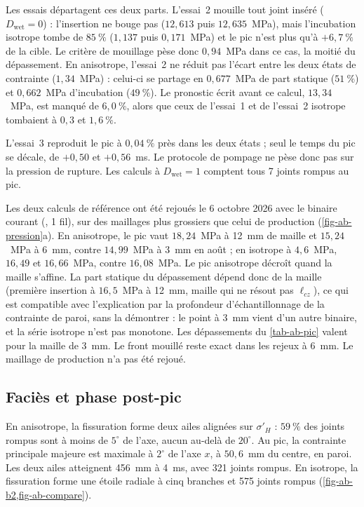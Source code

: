 Les essais départagent ces deux parts. L'essai~2 mouille tout joint inséré ($D_\text{wet} = 0$) : l'insertion ne bouge pas ($12{,}613$ puis $12{,}635$~MPa), mais l'incubation isotrope tombe de $85~\%$ ($1{,}137$ puis $0{,}171$~MPa) et le pic n'est plus qu'à $+6{,}7~\%$ de la cible. Le critère de mouillage pèse donc $0{,}94$~MPa dans ce cas, la moitié du dépassement. En anisotrope, l'essai~2 ne réduit pas l'écart entre les deux états de contrainte ($1{,}34$~MPa) : celui-ci se partage en $0{,}677$~MPa de part statique ($51~\%$) et $0{,}662$~MPa d'incubation ($49~\%$). Le pronostic écrit avant ce calcul, $13{,}34$~MPa, est manqué de $6{,}0~\%$, alors que ceux de l'essai~1 et de l'essai~2 isotrope tombaient à $0{,}3$ et $1{,}6~\%$.

L'essai~3 reproduit le pic à $0{,}04~\%$ près dans les deux états ; seul le temps du pic se décale, de $+0{,}50$ et $+0{,}56$~ms. Le protocole de pompage ne pèse donc pas sur la pression de rupture. Les calculs à $D_\text{wet} = 1$ comptent tous 7 joints rompus au pic.

Les deux calculs de référence ont été rejoués le 6 octobre 2026 avec le binaire courant (, 1 fil), sur des maillages plus grossiers que celui de production (\cref{fig-ab-pression}a). En anisotrope, le pic vaut $18{,}24$~MPa à 12~mm de maille et $15{,}24$~MPa à 6~mm, contre $14{,}99$~MPa à 3~mm en août ; en isotrope à $4{,}6$~MPa, $16{,}49$ et $16{,}66$~MPa, contre $16{,}08$~MPa. Le pic anisotrope décroît quand la maille s'affine. La part statique du dépassement dépend donc de la maille (première insertion à $16{,}5$~MPa à 12~mm, maille qui ne résout pas $\ell_{cz}$), ce qui est compatible avec l'explication par la profondeur d'échantillonnage de la contrainte de paroi, sans la démontrer : le point à 3~mm vient d'un autre binaire, et la série isotrope n'est pas monotone. Les dépassements du \cref{tab-ab-pic} valent pour la maille de 3~mm. Le front mouillé reste exact dans les rejeux à 6~mm. Le maillage de production n'a pas été rejoué.

\subsection{Faciès et phase post-pic}

En anisotrope, la fissuration forme deux ailes alignées sur $\sigma'_H$ : $59~\%$ des joints rompus sont à moins de $5^\circ$ de l'axe, aucun au-delà de $20^\circ$. Au pic, la contrainte principale majeure est maximale à $2^\circ$ de l'axe $x$, à $50{,}6$~mm du centre, en paroi. Les deux ailes atteignent 456~mm à 4~ms, avec 321 joints rompus. En isotrope, la fissuration forme une étoile radiale à cinq branches et 575 joints rompus (\cref{fig-ab-b2,fig-ab-compare}).

